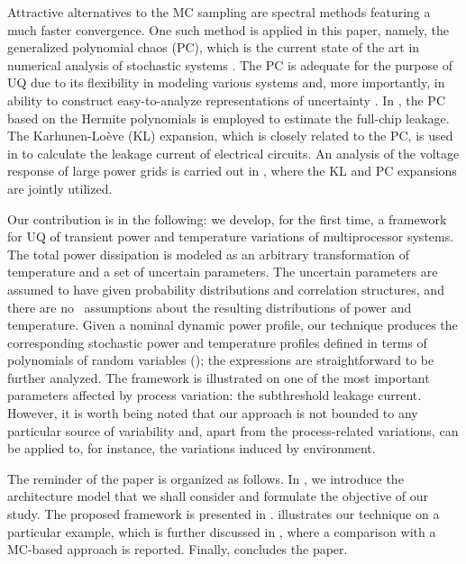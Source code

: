 Attractive alternatives to the MC sampling are spectral methods \cite{xiu2010, maitre2010, ghanem1991} featuring a much faster convergence. One such method is applied in this paper, namely, the generalized polynomial chaos (PC), which is the current state of the art in numerical analysis of stochastic systems \cite{xiu2010}. The PC is adequate for the purpose of UQ due to its flexibility in modeling various systems and, more importantly, in ability to construct easy-to-analyze representations of uncertainty \cite{eldred2009}. In \cite{shen2009}, the PC based on the Hermite polynomials is employed to estimate the full-chip leakage. The Karhunen-Lo\`{e}ve (KL) expansion, which is closely related to the PC, is used in \cite{bhardwaj2006} to calculate the leakage current of electrical circuits. An analysis of the voltage response of large power grids is carried out in \cite{ghanta2006}, where the KL and PC expansions are jointly utilized.

Our contribution is in the following: we develop, for the first time, a framework for UQ of transient power and temperature variations of multiprocessor systems. The total power dissipation is modeled as an arbitrary transformation of temperature and a set of uncertain parameters. The uncertain parameters are assumed to have given probability distributions and correlation structures, and there are no \apriori\ assumptions about the resulting distributions of power and temperature. Given a nominal dynamic power profile, our technique produces the corresponding stochastic power and temperature profiles defined in terms of polynomials of random variables (\rvs); the expressions are straightforward to be further analyzed. The framework is illustrated on one of the most important parameters affected by process variation: the subthreshold leakage current. However, it is worth being noted that our approach is not bounded to any particular source of variability and, apart from the process-related variations, can be applied to, for instance, the variations induced by environment.

The reminder of the paper is organized as follows. In , we introduce the architecture model that we shall consider and formulate the objective of our study. The proposed framework is presented in .  illustrates our technique on a particular example, which is further discussed in , where a comparison with a MC-based approach is reported. Finally,  concludes the paper.
